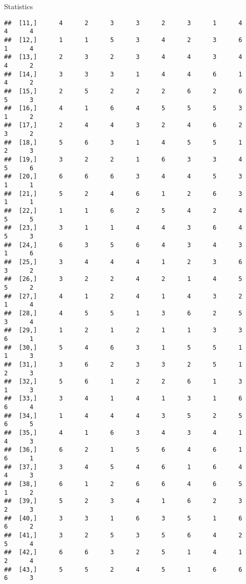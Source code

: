 \documentclass[
  ignorenonframetext,
]{beamer}
\begin{document}
\begin{frame}[fragile]{Statistics}
\begin{verbatim}
##  [11,]      4      2      3      3      2      3      1      4      4      4
##  [12,]      1      1      5      3      4      2      3      6      1      4
##  [13,]      2      3      2      3      4      4      3      4      4      2
##  [14,]      3      3      3      1      4      4      6      1      4      2
##  [15,]      2      5      2      2      2      6      2      6      5      3
##  [16,]      4      1      6      4      5      5      5      3      1      2
##  [17,]      2      4      4      3      2      4      6      2      3      2
##  [18,]      5      6      3      1      4      5      5      1      2      3
##  [19,]      3      2      2      1      6      3      3      4      5      6
##  [20,]      6      6      6      3      4      4      5      3      1      1
##  [21,]      5      2      4      6      1      2      6      3      1      1
##  [22,]      1      1      6      2      5      4      2      4      5      5
##  [23,]      3      1      1      4      4      3      6      4      5      3
##  [24,]      6      3      5      6      4      3      4      3      1      6
##  [25,]      3      4      4      4      1      2      3      6      3      2
##  [26,]      3      2      2      4      2      1      4      5      5      2
##  [27,]      4      1      2      4      1      4      3      2      1      4
##  [28,]      4      5      5      1      3      6      2      5      3      4
##  [29,]      1      2      1      2      1      1      3      3      6      1
##  [30,]      5      4      6      3      1      5      5      1      1      3
##  [31,]      3      6      2      3      3      2      5      1      2      3
##  [32,]      5      6      1      2      2      6      1      3      1      3
##  [33,]      3      4      1      4      1      3      1      6      6      4
##  [34,]      1      4      4      4      3      5      2      5      6      5
##  [35,]      4      1      6      3      4      3      4      1      4      3
##  [36,]      6      2      1      5      6      4      6      1      6      1
##  [37,]      3      4      5      4      6      1      6      4      4      3
##  [38,]      6      1      2      6      6      4      6      5      1      2
##  [39,]      5      2      3      4      1      6      2      3      2      3
##  [40,]      3      3      1      6      3      5      1      6      6      2
##  [41,]      3      2      5      3      5      6      4      2      5      4
##  [42,]      6      6      3      2      5      1      4      1      2      4
##  [43,]      5      5      2      4      5      1      6      6      6      3

\end{verbatim}
\end{frame}
\end{document}
